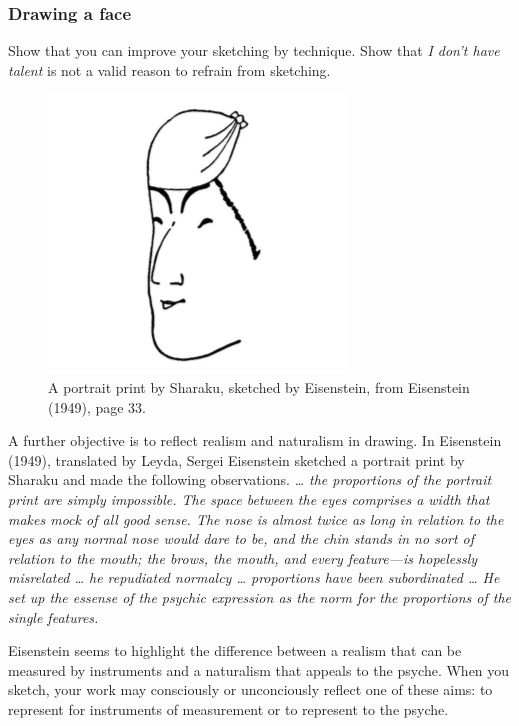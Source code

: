\hypertarget{drawing-a-face}{%
\subsubsection{Drawing a face}\label{drawing-a-face}}

Show that you can improve your sketching by technique. Show that \emph{I
don't have talent} is not a valid reason to refrain from sketching.

\begin{figure}[hbtp]
\begin{center}
\includegraphics[height=0.6\linewidth,width=0.60\linewidth]{fiSharaku.png}
\caption{A portrait print by Sharaku, sketched by Eisenstein, from Eisenstein (1949), page 33.}
\end{center}
\end{figure}

A further objective is to reflect realism and naturalism in drawing. In
Eisenstein (1949), translated by Leyda, Sergei Eisenstein sketched a
portrait print by Sharaku and made the following observations.
\emph{\ldots{} the proportions of the portrait print are simply
impossible. The space between the eyes comprises a width that makes mock
of all good sense. The nose is almost twice as long in relation to the
eyes as any normal nose would dare to be, and the chin stands in no sort
of relation to the mouth; the brows, the mouth, and every feature---is
hopelessly misrelated \ldots{} he repudiated normalcy \ldots{}
proportions have been subordinated \ldots{} He set up the essense of the
psychic expression as the norm for the proportions of the single
features.}

Eisenstein seems to highlight the difference between a realism that can
be measured by instruments and a naturalism that appeals to the psyche.
When you sketch, your work may consciously or unconciously reflect one
of these aims: to represent for instruments of measurement or to
represent to the psyche.

